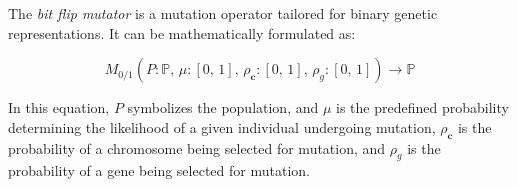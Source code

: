   \begin{definition}
    The \emph{bit flip mutator} is a mutation operator tailored for binary 
    genetic representations. It can be mathematically formulated as:

    \begin{equation}
      M_{0/1}(P: \mathbb{P},\, \mu: [0,\, 1],\, \rho_\mathbf{c}: [0,\, 1],\, \rho_g: [0,\, 1]) \to \mathbb{P}
    \end{equation}

    In this equation, \(P\) symbolizes the population, and \(\mu\) is the 
    predefined probability determining the likelihood of a given individual
    undergoing mutation, \(\rho_\mathbf{c}\) is the probability of a chromosome
    being selected for mutation, and \(\rho_g\) is the probability of a gene
    being selected for mutation.
  \end{definition}
